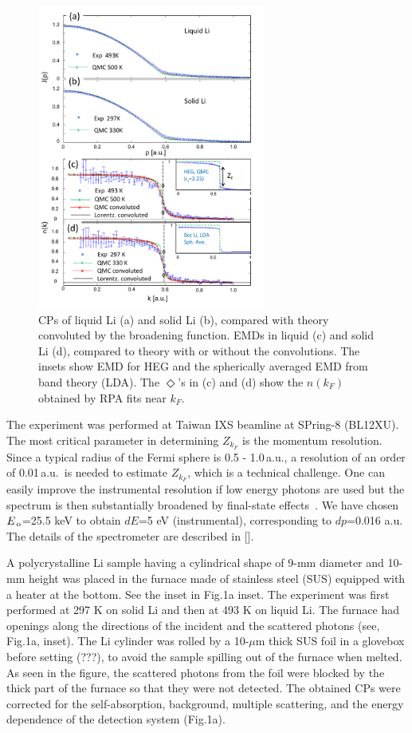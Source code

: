 \documentclass[twocolumn,showpacs,showkeys,fleqn,prl,superscriptaddress]{revtex4}%
\newcommand{\nn}[1]{\textnormal{ #1}}
\begin{document}
\begin{figure}
\includegraphics[bb= 50 10 500 720, width=7.5cm]{fig2.pdf}
\caption{CPs of liquid Li (a) and solid Li (b), compared with theory convoluted by the broadening function.  EMDs in liquid (c) and solid Li (d), compared to theory with or without the convolutions. The insets show EMD for HEG and the spherically averaged EMD from band theory (LDA). The $\Diamond$'s in (c) and (d)  show the $n(k_F)$ obtained by RPA fits near $k_F$.}
\label{Fig.2}
\end{figure}

The experiment was performed at Taiwan IXS beamline at SPring-8 (BL12XU).
The most critical parameter in determining $Z_{k_F}$ is the momentum resolution.
Since a typical radius of the Fermi sphere is 0.5 - 1.0\,a.u., a resolution of an order of 0.01\,a.u.\, is needed to estimate $Z_{k_F}$, which is a technical challenge.
One can easily improve the instrumental resolution if low energy photons are used but the spectrum is then substantially broadened by final-state effects~\cite{stern00,soi01}.
We have chosen $E_{\nn{\!o}}$=25.5 keV to obtain $dE$=5 eV (instrumental), corresponding to $dp$=0.016 a.u.
The details of the spectrometer are described in [].

A polycrystalline Li sample having a cylindrical shape of 9-mm diameter and 10-mm height was placed in the furnace made of stainless steel (SUS) equipped with a heater at the bottom. See the inset in Fig.1a inset.
The experiment was first performed at 297 K on solid Li and then at 493 K on liquid Li.
The furnace had openings along the directions of the incident and the scattered photons (see, Fig.1a, inset).
The Li cylinder was rolled by a 10-$\mu$m thick SUS foil in a glovebox before setting (???), to avoid the sample spilling out of the furnace when melted.
As seen in the figure, the scattered photons from the foil were blocked by the thick part of the furnace so that they were not detected.
The obtained CPs were corrected for the self-absorption, background, multiple scattering, and the energy dependence of the detection system (Fig.1a).
\end{document}
